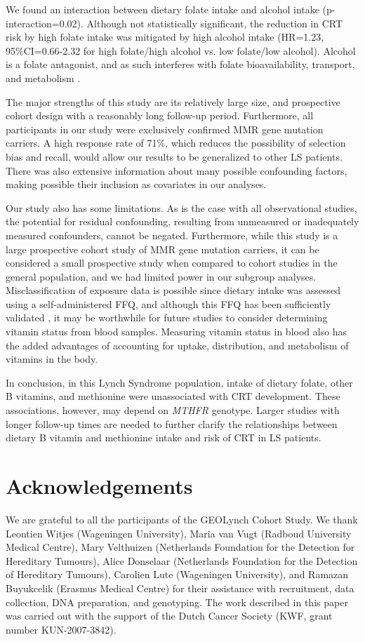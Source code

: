 \noindent We found an interaction between dietary folate intake and alcohol intake (p-interaction=0.02). Although not statistically significant, the reduction in CRT risk by high folate intake was mitigated by high alcohol intake (HR=1.23, 95\%CI=0.66-2.32 for high folate/high alcohol vs. low folate/low alcohol). Alcohol is a folate antagonist, and as such interferes with folate bioavailability, transport, and metabolism \cite{c650}.

\noindent The major strengths of this study are its relatively large size, and prospective cohort design with a reasonably long follow-up period. Furthermore, all participants in our study were exclusively confirmed MMR gene mutation carriers. A high response rate of 71\%, which reduces the possibility of selection bias and recall, would allow our results to be generalized to other LS patients. There was also extensive information about many possible confounding factors, making possible their inclusion as covariates in our analyses.

\noindent Our study also has some limitations. As is the case with all observational studies, the potential for residual confounding, resulting from unmeasured or inadequately measured confounders, cannot be negated. Furthermore, while this study is a large prospective cohort study of MMR gene mutation carriers, it can be considered a small prospective study when compared to cohort studies in the general population, and we had limited power in our subgroup analyses. Misclassification of exposure data is possible since dietary intake was assessed using a self-administered FFQ, and although this FFQ has been sufficiently validated \cite{c628,c629}, it may be worthwhile for future studies to consider determining vitamin status from blood samples. Measuring vitamin status in blood also has the added advantages of accounting for uptake, distribution, and metabolism of vitamins in the body.

\noindent In conclusion, in this Lynch Syndrome population, intake of dietary folate, other B vitamins, and methionine were unassociated with CRT development. These associations, however, may depend on \emph{MTHFR} genotype. Larger studies with longer follow-up times are needed to further clarify the relationships between dietary B vitamin and methionine intake and risk of CRT in LS patients. 

\section*{Acknowledgements} 
\noindent We are grateful to all the participants of the GEOLynch Cohort Study. We thank Leontien Witjes (Wageningen University), Maria van Vugt (Radboud University Medical Centre), Mary Velthuizen (Netherlands Foundation for the Detection for Hereditary Tumours), Alice Donselaar (Netherlands Foundation for the Detection of Hereditary Tumours), Carolien Lute (Wageningen University), and Ramazan Buyukcelik (Erasmus Medical Centre) for their assistance with recruitment, data collection, DNA preparation, and genotyping. The work described in this paper was carried out with the support of the Dutch Cancer Society (KWF, grant number KUN-2007-3842). 
 
